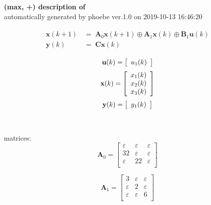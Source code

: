\documentclass[11pt, a4paper, fleqn]{article}
\begin{document}
\noindent
\textbf{(max, +) description of} \texttt{\currfilebase} \\
automatically generated by phoebe ver.1.0 on 2019-10-13 16:46:20 

\begin{align}\begin{split}
\mathbf{x}(k+1) & \, = \; \mathbf{A}_{0}\mathbf{x}(k+1) \oplus \mathbf{A}_{1}\mathbf{x}(k) \oplus \mathbf{B}_{1}\mathbf{u}(k)\\
\mathbf{y}(k) & \, = \; \mathbf{Cx}(k)
\end{split}\end{align}

\begin{equation*}
\mathbf{u}(k) = 
\left[\begin{array}{*{20}c}
  u_1(k) \\
\end{array}\right]
\end{equation*}
\begin{equation*}
\mathbf{x}(k) = 
\left[\begin{array}{*{20}c}
  x_1(k) \\
  x_2(k) \\
  x_3(k) \\
\end{array}\right]
\end{equation*}
\begin{equation*}
\mathbf{y}(k) = 
\left[\begin{array}{*{20}c}
  y_1(k) \\
\end{array}\right]
\end{equation*}
\\
\\
matrices:
\begin{equation*}
\mathbf{A}_{0} = 
\left[\begin{array}{ ccc }
\varepsilon	&\varepsilon	&\varepsilon\\
32	&\varepsilon	&\varepsilon\\
\varepsilon	&22	&\varepsilon\\
\end{array}\right]
\end{equation*}

\begin{equation*}
\mathbf{A}_{1} = 
\left[\begin{array}{ ccc }
3	&\varepsilon	&\varepsilon\\
\varepsilon	&2	&\varepsilon\\
\varepsilon	&\varepsilon	&6\\
\end{array}\right]
\end{equation*}
\end{document}
